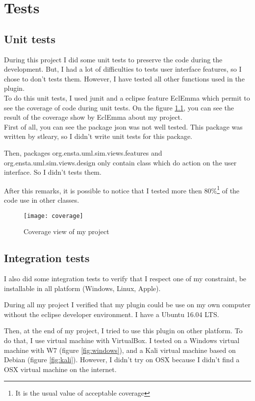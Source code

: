 
\chapter{Tests}
\label{chap:test}

\section{Unit tests}

During this project I did some unit tests to preserve the code during the development. But, I had a lot of difficulties to tests user interface features, so I chose to don't tests them. However, I have tested all other functions used in the plugin.
~\\

To do this unit tests, I used junit and a eclipse feature EclEmma which permit to see the coverage of code during unit tests. On the figure \ref{fig:coverage}, you can see the result of the coverage show by EclEmma about my project.
~\\

First of all, you can see the package json was not well tested. This package was written by stleary\cite{json}, so I didn't write unit tests for this package.

Then, packages org.ensta.uml.sim.views.features and org.ensta.uml.sim.views.design only contain class which do action on the user interface. So I didn't tests them.

After this remarks, it is possible to notice that I tested more then 80\%\footnote{It is the usual value of acceptable coverage} of the code use in other classes.


\begin{figure}[h]
  \centering
  \texttt{[image: coverage]}
  \caption{Coverage view of my project}
  \label{fig:coverage}
\end{figure}

\section{Integration tests}

I also did some integration tests to verify that I respect one of my constraint, be installable  in all platform (Windows, Linux, Apple).

During all my project I verified that my plugin could be use on my own computer without the eclipse developer environment. I have a Ubuntu 16.04 LTS.

Then, at the end of my project, I tried to use this plugin on other platform. To do that, I use virtual machine with VirtualBox. I tested on a Windows virtual machine with W7 (figure \ref{fig:windows}), and a Kali virtual machine based on Debian (figure \ref{fig:kali}). However, I didn't try on OSX because I didn't find a OSX virtual machine on the internet.

